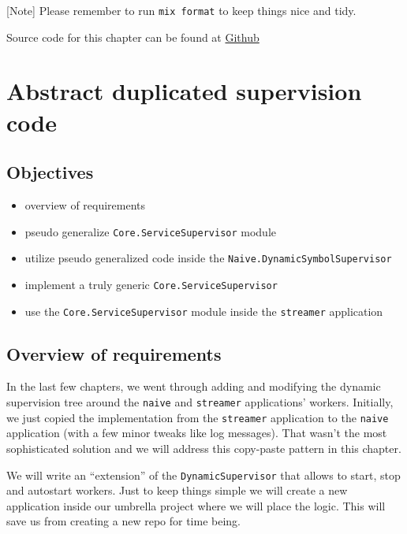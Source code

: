 \documentclass[
  oneside]{book}
\providecommand{\tightlist}{%
  \setlength{\itemsep}{0pt}\setlength{\parskip}{0pt}}
\begin{document}
{[}Note{]} Please remember to run \texttt{mix\ format} to keep things nice and tidy.

Source code for this chapter can be found at \href{https://github.com/frathon/create-a-cryptocurrency-trading-bot-in-elixir-source-code/tree/chapter_12}{Github}

\hypertarget{abstract-duplicated-supervision-code}{%
\chapter{Abstract duplicated supervision code}\label{abstract-duplicated-supervision-code}}

\hypertarget{objectives-12}{%
\section{Objectives}\label{objectives-12}}

\begin{itemize}
\tightlist
\item
  overview of requirements
\item
  pseudo generalize \texttt{Core.ServiceSupervisor} module
\item
  utilize pseudo generalized code inside the \texttt{Naive.DynamicSymbolSupervisor}
\item
  implement a truly generic \texttt{Core.ServiceSupervisor}
\item
  use the \texttt{Core.ServiceSupervisor} module inside the \texttt{streamer} application
\end{itemize}

\hypertarget{overview-of-requirements}{%
\section{Overview of requirements}\label{overview-of-requirements}}

In the last few chapters, we went through adding and modifying the dynamic supervision tree around the \texttt{naive} and \texttt{streamer} applications' workers. Initially, we just copied the implementation from the \texttt{streamer} application to the \texttt{naive} application (with a few minor tweaks like log messages). That wasn't the most sophisticated solution and we will address this copy-paste pattern in this chapter.

We will write an ``extension'' of the \texttt{DynamicSupervisor} that allows to start, stop and autostart workers. Just to keep things simple we will create a new application inside our umbrella project where we will place the logic. This will save us from creating a new repo for time being.
\end{document}
